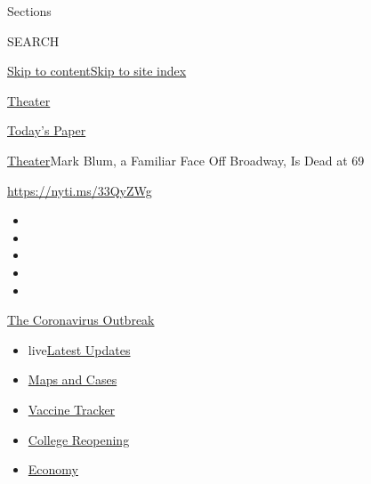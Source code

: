 Sections

SEARCH

\protect\hyperlink{site-content}{Skip to
content}\protect\hyperlink{site-index}{Skip to site index}

\href{https://www.nytimes.com/section/theater}{Theater}

\href{https://myaccount.nytimes.com/auth/login?response_type=cookie\&client_id=vi}{}

\href{https://www.nytimes.com/section/todayspaper}{Today's Paper}

\href{/section/theater}{Theater}\textbar{}Mark Blum, a Familiar Face Off
Broadway, Is Dead at 69

\url{https://nyti.ms/33QyZWg}

\begin{itemize}
\item
\item
\item
\item
\item
\end{itemize}

\href{https://www.nytimes.com/news-event/coronavirus?action=click\&pgtype=Article\&state=default\&region=TOP_BANNER\&context=storylines_menu}{The
Coronavirus Outbreak}

\begin{itemize}
\tightlist
\item
  live\href{https://www.nytimes.com/2020/08/03/world/coronavirus-covid-19.html?action=click\&pgtype=Article\&state=default\&region=TOP_BANNER\&context=storylines_menu}{Latest
  Updates}
\item
  \href{https://www.nytimes.com/interactive/2020/us/coronavirus-us-cases.html?action=click\&pgtype=Article\&state=default\&region=TOP_BANNER\&context=storylines_menu}{Maps
  and Cases}
\item
  \href{https://www.nytimes.com/interactive/2020/science/coronavirus-vaccine-tracker.html?action=click\&pgtype=Article\&state=default\&region=TOP_BANNER\&context=storylines_menu}{Vaccine
  Tracker}
\item
  \href{https://www.nytimes.com/2020/08/02/us/covid-college-reopening.html?action=click\&pgtype=Article\&state=default\&region=TOP_BANNER\&context=storylines_menu}{College
  Reopening}
\item
  \href{https://www.nytimes.com/live/2020/08/03/business/stock-market-today-coronavirus?action=click\&pgtype=Article\&state=default\&region=TOP_BANNER\&context=storylines_menu}{Economy}
\end{itemize}

